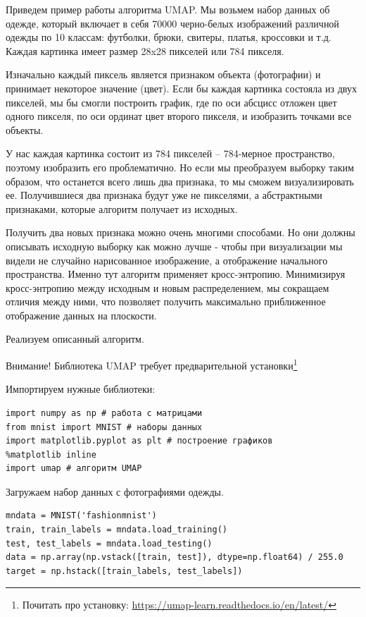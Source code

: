 \begin{itemize}
	Приведем пример работы алгоритма UMAP. Мы возьмем набор данных об одежде, который включает в себя 70000 черно-белых изображений различной одежды по 10 классам: футболки, брюки, свитеры, платья, кроссовки и т.д. Каждая картинка имеет размер 28x28 пикселей или 784 пикселя.
	
	Изначально каждый пиксель является признаком объекта (фотографии) и принимает некоторое значение (цвет). Если бы каждая картинка состояла из двух пикселей, мы бы смогли построить график, где по оси абсцисс отложен цвет одного пикселя, по оси ординат цвет второго пикселя, и изобразить точками все объекты.
	
	У нас каждая картинка состоит из 784 пикселей -- 784-мерное пространство, поэтому изобразить его проблематично. Но если мы преобразуем выборку таким образом, что останется всего лишь два признака, то мы сможем визуализировать ее. Получившиеся два признака будут уже не пикселями, а абстрактными признаками, которые алгоритм получает из исходных.
	
	Получить два новых признака можно очень многими способами. Но они должны описывать исходную выборку как можно лучше - чтобы при визуализации мы видели не случайно нарисованное изображение, а отображение начального пространства. Именно тут алгоритм применяет кросс-энтропию. Минимизируя кросс-энтропию между исходным и новым распределением, мы сокращаем отличия между ними, что позволяет получить максимально приближенное отображение данных на плоскости.
	
	Реализуем описанный алгоритм.
	
	Внимание! Библиотека UMAP требует предварительной установки\footnote{Почитать про установку: \url{https://umap-learn.readthedocs.io/en/latest/}}
	
	Импортируем нужные библиотеки:
	\begin{verbatim}
import numpy as np # работа с матрицами
from mnist import MNIST # наборы данных
import matplotlib.pyplot as plt # построение графиков
%matplotlib inline
import umap # алгоритм UMAP
	\end{verbatim}
	
	Загружаем набор данных с фотографиями одежды.
	\begin{verbatim}
mndata = MNIST('fashionmnist')
train, train_labels = mndata.load_training() 
test, test_labels = mndata.load_testing()
data = np.array(np.vstack([train, test]), dtype=np.float64) / 255.0
target = np.hstack([train_labels, test_labels])
	\end{verbatim}


\end{itemize}
